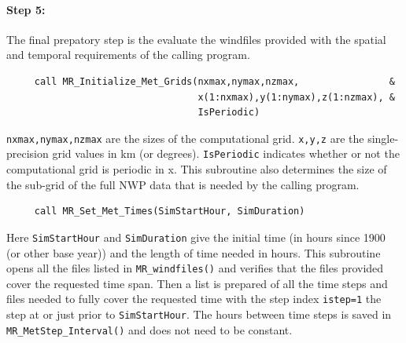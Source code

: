 \documentclass[11pt]{article}   %
\begin{document}
\paragraph{Step 5:} The final prepatory step is the evaluate the windfiles provided
with the spatial and temporal requirements of the calling program.
\begin{verbatim}
     call MR_Initialize_Met_Grids(nxmax,nymax,nzmax,                &
                                  x(1:nxmax),y(1:nymax),z(1:nzmax), &
                                  IsPeriodic)
\end{verbatim}
\texttt{nxmax,nymax,nzmax} are the sizes of the computational grid. \texttt{x,y,z} are the
single-precision grid values in km (or degrees).  \texttt{IsPeriodic} indicates whether or
not the computational grid is periodic in x.  This subroutine also determines the size
of the sub-grid of the full NWP data that is needed by the calling program.
\begin{verbatim}
     call MR_Set_Met_Times(SimStartHour, SimDuration)
\end{verbatim}
Here \texttt{SimStartHour} and \texttt{SimDuration} give the initial time (in hours since 1900 (or
other base year)) and the length of time needed in hours.  This subroutine opens all the
files listed in \texttt{MR\_windfiles()} and verifies that the files provided cover the requested
time span.  Then a list is prepared of all the time steps and files needed to fully cover the 
requested time with the step index \texttt{istep=1} the step at or just prior to \texttt{SimStartHour}.
The hours between time steps is saved in \texttt{MR\_MetStep\_Interval()} and does not need to
be constant.

\end{document}
